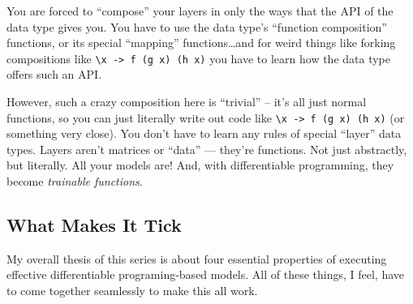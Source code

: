 \documentclass[]{article}
\begin{document}
You are forced to ``compose'' your layers in only the ways that the API of the
data type gives you. You have to use the data type's ``function composition''
functions, or its special ``mapping'' functions\ldots and for weird things like
forking compositions like
\texttt{\textbackslash{}x\ -\textgreater{}\ f\ (g\ x)\ (h\ x)} you have to learn
how the data type offers such an API.

However, such a crazy composition here is ``trivial'' -- it's all just normal
functions, so you can just literally write out code like
\texttt{\textbackslash{}x\ -\textgreater{}\ f\ (g\ x)\ (h\ x)} (or something
very close). You don't have to learn any rules of special ``layer'' data types.
Layers aren't matrices or ``data'' --- they're functions. Not just abstractly,
but literally. All your models are! And, with differentiable programming, they
become \emph{trainable functions}.

\subsection{What Makes It Tick}\label{what-makes-it-tick}

My overall thesis of this series is about four essential properties of executing
effective differentiable programing-based models. All of these things, I feel,
have to come together seamlessly to make this all work.
\end{document}
